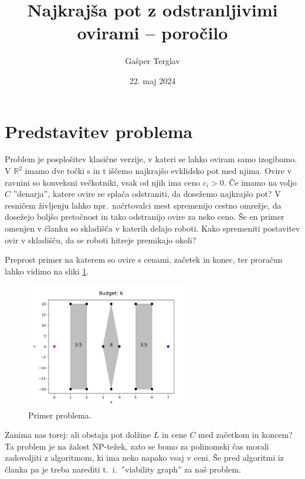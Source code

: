 \documentclass{article}
\author{Gašper Terglav}
\date{22. maj 2024}
\title{Najkrajša pot z odstranljivimi ovirami --  poročilo}
\begin{document}
\maketitle


\section*{Predstavitev problema}

Problem je posplošitev klasične verzije, v kateri se lahko oviram samo izogibamo. V $\mathbb{R}^2$ imamo dve točki s in t iščemo najkrajšo evklidsko pot med njima. Ovire v ravnini so konveksni večkotniki, vsak od njih ima ceno $c_i > 0$. Če imamo na voljo $C$ ''denarja'', katere ovire se splača odstraniti, da dosežemo najkrajšo pot? V resničem življenju lahko npr.\ načrtovalci mest spremenijo cestno omrežje, da dosežejo boljšo pretočnost in tako odstranijo ovire za neko ceno. Še en primer omenjen v članku so skladišča v katerih delajo roboti. Kako spremeniti postavitev ovir v skladišču, da se roboti hitreje premikajo okoli? 

Preprost primer na katerem so ovire s cenami, začetek in konec, ter proračun lahko vidimo na sliki \ref{fig:errPr1}.

\begin{figure}[h]
    \centering
    \includegraphics[width=0.65\textwidth]{err1.png}
    \caption{Primer problema.}
    \label{fig:errPr1}
\end{figure}


Zanima nas torej: ali obstaja pot dolžine $L$ in cene $C$ med začetkom in koncem? Ta problem je na žalost NP-težek, zato se bomo za polinomski čas morali zadovoljiti z algoritmom, ki ima neko napako vsaj v ceni. Še pred algoritmi iz članka pa je treba narediti t.~i.\ ''viability graph'' za naš problem.



\end{document}
